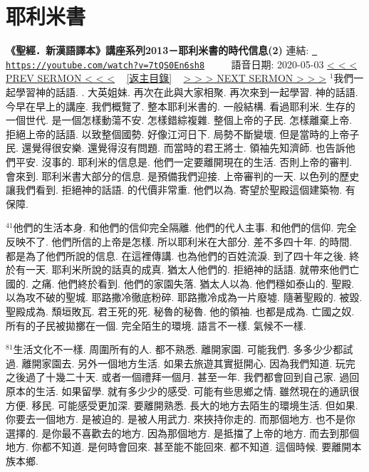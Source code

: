 \documentclass{book}
\begin{document}
\section{耶利米書}
\label{sec:7tQS0En6sh8}
\textbf{《聖經．新漢語譯本》講座系列2013－耶利米書的時代信息(2)}
\newline
\newline
連結: \href{https://youtube.com/watch?v=7tQS0En6sh8}{\texttt{ https://youtube.com/watch?v=7tQS0En6sh8}} ~~~~ 語音日期: 2020-05-03 
\newline
\newline
\hyperref[sec:WEwyO2xJwfc]{\small{< < < PREV SERMON < < <}}
~
\hyperref[sec:index]{\small{[返主目錄]}}
~
\hyperref[sec:KKs6xvdps8w]{\small{> > > NEXT SERMON > > >}}
\newline
\newline
$^{1}$我們一起學習神的話語.
.
大英姐妹.
再次在此與大家相聚.
再次來到一起學習.
神的話語.
今早在早上的講座.
我們概覽了.
整本耶利米書的.
一般結構.
看過耶利米.
生存的一個世代.
是一個怎樣動蕩不安.
怎樣錯綜複雜.
整個上帝的子民.
怎樣離棄上帝.
拒絕上帝的話語.
以致整個國勢.
好像江河日下.
局勢不斷變壞.
但是當時的上帝子民.
還覺得很安樂.
還覺得沒有問題.
而當時的君王將士.
領袖先知濟師.
也告訴他們平安.
沒事的.
耶利米的信息是.
他們一定要離開現在的生活.
否則上帝的審判.
會來到.
耶利米書大部分的信息.
是預備我們迎接.
上帝審判的一天.
以色列的歷史讓我們看到.
拒絕神的話語.
的代價非常重.
他們以為.
寄望於聖殿這個建築物.
有保障.

$^{41}$他們的生活本身.
和他們的信仰完全隔離.
他們的代人主事.
和他們的信仰.
完全反映不了.
他們所信的上帝是怎樣.
所以耶利米在大部分.
差不多四十年.
的時間.
都是為了他們所說的信息.
在這裡傳講.
也為他們的百姓流淚.
到了四十年之後.
終於有一天.
耶利米所說的話真的成真.
猶太人他們的.
拒絕神的話語.
就帶來他們亡國的.
之痛.
他們終於看到.
他們的家園失落.
猶太人以為.
他們穩如泰山的.
聖殿.
以為攻不破的聖城.
耶路撒冷徹底粉碎.
耶路撒冷成為一片廢墟.
隨著聖殿的.
被毀.
聖殿成為.
頹垣敗瓦.
君王死的死.
秘魯的秘魯.
他的領袖.
也都是成為.
亡國之奴.
所有的子民被拋擲在一個.
完全陌生的環境.
語言不一樣.
氣候不一樣.

$^{81}$生活文化不一樣.
周圍所有的人.
都不熟悉.
離開家園.
可能我們.
多多少少都試過.
離開家園去.
另外一個地方生活.
如果去旅遊其實挺開心.
因為我們知道.
玩完之後過了十幾二十天.
或者一個禮拜一個月.
甚至一年.
我們都會回到自己家.
過回原本的生活.
如果留學.
就有多少少的感受.
可能有些思鄉之情.
雖然現在的通訊很方便.
移民.
可能感受更加深.
要離開熟悉.
長大的地方去陌生的環境生活.
但如果.
你要去一個地方.
是被迫的.
是被人用武力.
來挾持你走的.
而那個地方.
也不是你選擇的.
是你最不喜歡去的地方.
因為那個地方.
是抵擋了上帝的地方.
而去到那個地方.
你都不知道.
是何時會回來.
甚至能不能回來.
都不知道.
這個時候.
要離開本族本鄉.
\end{document}
